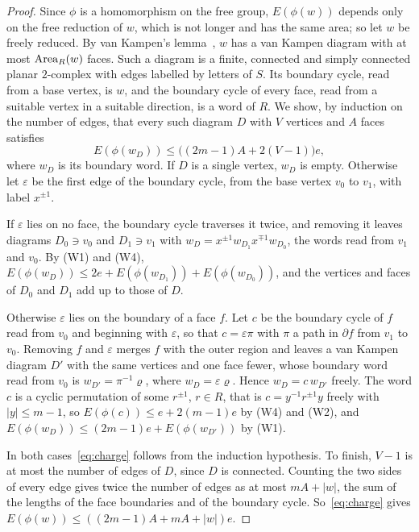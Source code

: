 \begin{proof}
Since $\phi$ is a homomorphism on the free group, $E(\phi(w))$ depends only on the free reduction of $w$, which is not longer and has the same
area; so let $w$ be freely reduced. By van Kampen's lemma~\cite[Chapter~V]{LyndonSchupp1977}, $w$ has a van Kampen diagram with at most
$\operatorname{Area}_R(w)$ faces. Such a diagram is a finite, connected and simply connected planar $2$-complex with edges labelled by letters of $S$. Its
boundary cycle, read from a base vertex, is $w$, and the boundary cycle of every face, read from a suitable vertex in a suitable direction, is
a word of $R$. We show, by induction on the number of edges, that every such diagram $D$ with $V$ vertices and $A$ faces satisfies
\begin{equation}\label{eq:charge}
E(\phi(w_D))\le\bigl((2m-1)A+2(V-1)\bigr)e ,
\end{equation}
where $w_D$ is its boundary word. If $D$ is a single vertex, $w_D$ is empty. Otherwise let $\varepsilon$ be the first edge of the boundary cycle,
from the base vertex $v_0$ to $v_1$, with label $x^{\pm1}$.

If $\varepsilon$ lies on no face, the boundary cycle traverses it twice, and removing it leaves diagrams $D_0\ni v_0$ and $D_1\ni v_1$ with
$w_D=x^{\pm1}w_{D_1}x^{\mp1}w_{D_0}$, the words read from $v_1$ and $v_0$. By (W1) and (W4), $E(\phi(w_D))\le2e+E(\phi(w_{D_1}))+E(\phi(w_{D_0}))$, and
the vertices and faces of $D_0$ and $D_1$ add up to those of $D$.

Otherwise $\varepsilon$ lies on the boundary of a face $f$. Let $c$ be the boundary cycle of $f$ read from $v_0$ and beginning with $\varepsilon$,
so that $c=\varepsilon\pi$ with $\pi$ a path in $\partial f$ from $v_1$ to $v_0$. Removing $f$ and $\varepsilon$ merges $f$ with the outer
region and leaves a van Kampen diagram $D'$ with the same vertices and one face fewer, whose boundary word read from $v_0$ is
$w_{D'}=\pi^{-1}\varrho$, where $w_D=\varepsilon\varrho$. Hence
$w_D=c\,w_{D'}$ freely. The word $c$ is a cyclic permutation of some $r^{\pm1}$, $r\in R$, that is $c=y^{-1}r^{\pm1}y$ freely with $|y|\le m-1$, so
$E(\phi(c))\le e+2(m-1)e$ by (W4) and (W2), and $E(\phi(w_D))\le(2m-1)e+E(\phi(w_{D'}))$ by (W1).

In both cases~\eqref{eq:charge} follows from the induction hypothesis. To finish, $V-1$ is at most the number of edges of $D$, since $D$ is
connected. Counting the two sides of every edge gives twice the number of edges as at most $mA+|w|$, the sum of the lengths of the face
boundaries and of the boundary cycle. So~\eqref{eq:charge} gives $E(\phi(w))\le((2m-1)A+mA+|w|)e$.
\end{proof}

